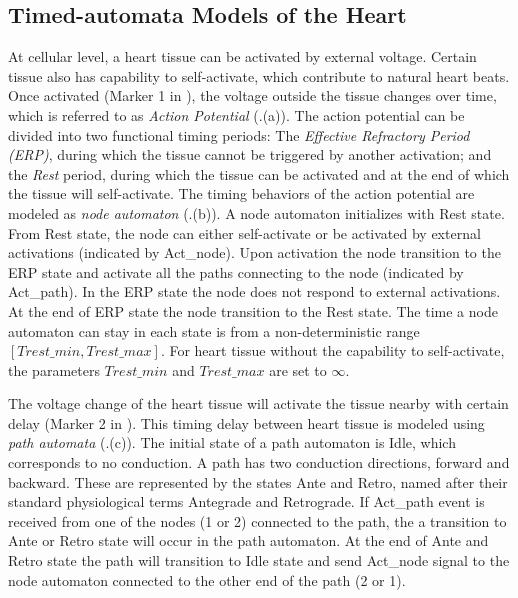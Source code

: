 \subsection{Timed-automata Models of the Heart}
At cellular level, a heart tissue can be activated by external voltage. Certain tissue also has capability to self-activate, which contribute to natural heart beats. Once activated (Marker 1 in ), the voltage outside the tissue changes over time, which is referred to as \emph{Action Potential} (.(a)). The action potential can be divided into two functional timing periods: The \emph{Effective Refractory Period (ERP)}, during which the tissue cannot be triggered by another activation; and the \emph{Rest} period, during which the tissue can be activated and at the end of which the tissue will self-activate. The timing behaviors of the action potential are modeled as \emph{node automaton} (.(b)). A node automaton initializes with \textsf{Rest} state.
From \textsf{Rest} state, the node can either self-activate or be activated by external activations (indicated by Act\_node). Upon activation the node transition to the \textsf{ERP} state and activate all the paths connecting to the node (indicated by Act\_path). 
In the \textsf{ERP} state the node does not respond to external activations. At the end of \textsf{ERP} state the node transition to the \textsf{Rest} state. The time a node automaton can stay in each state is from a non-deterministic range $[Trest\_min,Trest\_max]$.
For heart tissue without the capability to self-activate, the parameters $Trest\_min$ and $Trest\_max$ are set to $\infty$.

The voltage change of the heart tissue will activate the tissue nearby with certain delay (Marker 2 in ). This timing delay between heart tissue is modeled using \emph{path automata} (.(c)). The initial state of a path automaton is \textsf{Idle}, which corresponds to no conduction. 
A path has two conduction directions, forward and backward.
These are represented by the states \textsf{Ante} and \textsf{Retro}, named after their standard physiological terms Antegrade and Retrograde.
If \textsf{Act\_path} event is received from one of the nodes (1 or 2) connected to the path, the a transition to \textsf{Ante} or \textsf{Retro} state will occur in the path automaton. 
At the end of \textsf{Ante} and \textsf{Retro} state the path will transition to \textsf{Idle} state and send Act\_node signal to the node automaton connected to the other end of the path (2 or 1).

